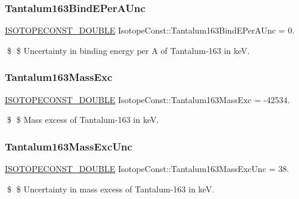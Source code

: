 \subsubsection{\texorpdfstring{Tantalum163\+Bind\+E\+Per\+A\+Unc}{Tantalum163BindEPerAUnc}}
{\footnotesize\ttfamily \mbox{\hyperlink{group___isotope_const-_macros_ga8f45a7272ce02c0b4c65c44636ed719a}{I\+S\+O\+T\+O\+P\+E\+C\+O\+N\+S\+T\+\_\+\+D\+O\+U\+B\+LE}} Isotope\+Const\+::\+Tantalum163\+Bind\+E\+Per\+A\+Unc = 0.}

\$ \$ Uncertainty in binding energy per A of Tantalum-\/163 in keV. \mbox{\label{group___isotope_const-_tantalum-_ta163_ga1d9ce288029d0e18640e885ea58d0384}} 
\subsubsection{\texorpdfstring{Tantalum163\+Mass\+Exc}{Tantalum163MassExc}}
{\footnotesize\ttfamily \mbox{\hyperlink{group___isotope_const-_macros_ga8f45a7272ce02c0b4c65c44636ed719a}{I\+S\+O\+T\+O\+P\+E\+C\+O\+N\+S\+T\+\_\+\+D\+O\+U\+B\+LE}} Isotope\+Const\+::\+Tantalum163\+Mass\+Exc = -\/42534.}

\$ \$ Mass excess of Tantalum-\/163 in keV. \mbox{\label{group___isotope_const-_tantalum-_ta163_gaeef3fd9c24a59492131f2b06e349e7a4}} 
\subsubsection{\texorpdfstring{Tantalum163\+Mass\+Exc\+Unc}{Tantalum163MassExcUnc}}
{\footnotesize\ttfamily \mbox{\hyperlink{group___isotope_const-_macros_ga8f45a7272ce02c0b4c65c44636ed719a}{I\+S\+O\+T\+O\+P\+E\+C\+O\+N\+S\+T\+\_\+\+D\+O\+U\+B\+LE}} Isotope\+Const\+::\+Tantalum163\+Mass\+Exc\+Unc = 38.}

\$ \$ Uncertainty in mass excess of Tantalum-\/163 in keV. \mbox{\label{group___isotope_const-_tantalum-_ta163_ga3df8869324d1c83876bdeed669af6dfa}} 
